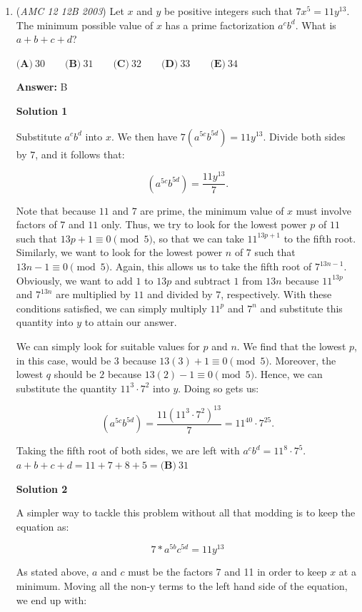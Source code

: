 \begin{enumerate}
	\item (\textit{AMC 12 12B 2003}) Let $x$ and $y$ be positive integers such that $7x^5 = 11y^{13}.$ The minimum possible value of $x$ has a prime factorization $a^cb^d.$ What is $a + b + c + d$?


 $\textbf{(A)}\ 30 \qquad \textbf{(B)}\ 31 \qquad \textbf{(C)}\ 32 \qquad \textbf{(D)}\ 33 \qquad \textbf{(E)}\ 34$

 \textbf{Answer: }B



\textbf{Solution 1}

Substitute $a^cb^d$ into $x$. We then have $7(a^{5c}b^{5d}) = 11y^{13}$. Divide both sides by $7$, and it follows that:

 
 \[(a^{5c}b^{5d}) = \frac{11y^{13}}{7}.\]

 Note that because $11$ and $7$ are prime, the minimum value of $x$ must involve factors of $7$ and $11$ only. Thus, we try to look for the lowest power $p$ of $11$ such that $13p + 1 \equiv 0 \pmod{5}$, so that we can take $11^{13p + 1}$ to the fifth root. Similarly, we want to look for the lowest power $n$ of $7$ such that $13n - 1 \equiv 0 \pmod{5}$. Again, this allows us to take the fifth root of $7^{13n - 1}$. Obviously, we want to add $1$ to $13p$ and subtract $1$ from $13n$ because $11^{13p}$ and $7^{13n}$ are multiplied by $11$ and divided by $7$, respectively. With these conditions satisfied, we can simply multiply $11^{p}$ and $7^{n}$ and substitute this quantity into $y$ to attain our answer.

 
We can simply look for suitable values for $p$ and $n$. We find that the lowest $p$, in this case, would be $3$ because $13(3) + 1 \equiv 0 \pmod{5}$. Moreover, the lowest $q$ should be $2$ because $13(2) - 1 \equiv 0 \pmod{5}$. Hence, we can substitute the quantity $11^{3} \cdot 7^{2}$ into $y$. Doing so gets us:

 
 \[(a^{5c}b^{5d}) = \frac{11(11^{3} \cdot 7^{2})^{13}}{7} = 11^{40} \cdot 7^{25}.\]

 Taking the fifth root of both sides, we are left with $a^cb^d = 11^{8} \cdot 7^{5}$. $a + b + c + d = 11 + 7 + 8 + 5 = \boxed{\textbf{(B)}\ 31}$




\textbf{Solution 2}

A simpler way to tackle this problem without all that modding is to keep the equation as:

 
 \[7*a^{5b}c^{5d} = 11y^{13}\]

 As stated above, $a$ and $c$ must be the factors 7 and 11 in order to keep $x$ at a minimum. Moving all the non-y terms to the left hand side of the equation, we end up with:


\end{enumerate}
